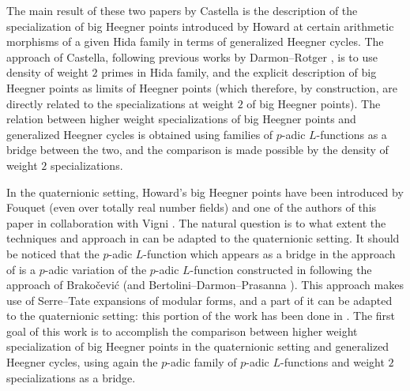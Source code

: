 \documentclass[a4paper,11pt]{amsart}
\numberwithin{equation}{section}
\theoremstyle{plain}
\theoremstyle{definition}
\theoremstyle{remark}
\begin{document}
The main result of these two papers \cite{Castella-MathAnn, Castella} by Castella is the description of the specialization of big Heegner points introduced by Howard \cite{Howard-Inv} 
at certain arithmetic morphisms of a given Hida family in terms of generalized Heegner cycles. The approach of Castella, following previous works by Darmon--Rotger \cite{DR}, is to use density of weight $2$ primes in Hida family, and the explicit description of big Heegner points as limits of Heegner points (which therefore, by construction, are directly related to the specializations at weight $2$ of big Heegner points). The relation between higher weight specializations of big Heegner points and generalized Heegner cycles is obtained using families of $p$-adic $L$-functions as a bridge between the two, and the comparison is made possible by the density of weight $2$ specializations. 

In the quaternionic setting, Howard's big Heegner points have been introduced by Fouquet \cite{Fouquet} (even over totally real number fields) and one of the authors of this paper in collaboration with Vigni \cite{LV-MM}. The natural question is to what extent the techniques and approach in \cite{Castella-MathAnn, Castella, DR} can be adapted to the quaternionic setting. It should be noticed that the $p$-adic $L$-function 
which appears as a bridge in the approach of \cite{Castella} is a $p$-adic variation of the $p$-adic $L$-function constructed in \cite{CH} following the approach of Brako\v{c}evi\'{c} \cite{Brako} (and Bertolini--Darmon--Prasanna \cite{BDP}). This approach makes use of Serre--Tate expansions of modular forms, and a part of it can be adapted to 
the quaternionic setting: this portion of the work has been done in \cite{LMW}. The first goal of this work is to accomplish the comparison between higher weight specialization of big Heegner points in the quaternionic setting and generalized Heegner cycles, using again the $p$-adic family of $p$-adic $L$-functions and weight $2$ specializations as a bridge. 
\end{document}
